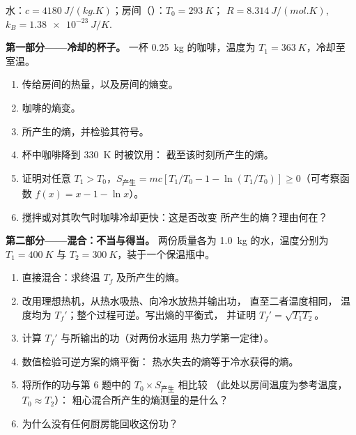\begin{problem}
\label{pb:b1:second-law-entropy:1}
水：$c = \qty{4180}{J/(kg.K)}$；房间（）：$T_0 = \qty{293}{K}$；
$R = \qty{8.314}{J/(mol.K)}$, $k_B = \qty{1.38e-23}{J/K}$.

\medskip
\noindent\textbf{第一部分——冷却的杯子。}
一杯 \qty{0.25}{kg} 的咖啡，温度为 $T_1 = \qty{363}{K}$，冷却至
室温。
\begin{enumerate}
  \item 传给房间的热量，以及房间的熵变。
  \item 咖啡的熵变。
  \item 所产生的熵，并检验其符号。
  \item 杯中咖啡降到 \qty{330}{K} 时被饮用：
        截至该时刻所产生的熵。
  \item 证明对任意 $T_1 > T_0$，$S_{\text{产生}} = mc[T_1/T_0 - 1 -
        \ln(T_1/T_0)] \geq 0$（可考察函数 $f(x) = x - 1 - \ln x$）。
  \item 搅拌或对其吹气时咖啡冷却更快：这是否改变
        所产生的熵？理由何在？
\end{enumerate}

\medskip
\noindent\textbf{第二部分——混合：不当与得当。}
两份质量各为 \qty{1.0}{kg} 的水，温度分别为 $T_1 = \qty{400}{K}$ 与 $T_2 =
\qty{300}{K}$，装于一个保温瓶中。
\begin{enumerate}[resume]
  \item 直接混合：求终温 $T_f$ 及所产生的熵。
  \item 改用理想热机，从热水吸热、向冷水放热并输出功，
        直至二者温度相同，
        温度均为 $T_f'$；整个过程可逆。写出熵的平衡式，
        并证明 $T_f' = \sqrt{T_1T_2}$。
  \item 计算 $T_f'$ 与所输出的功（对两份水运用
        热力学第一定律）。
  \item 数值检验可逆方案的熵平衡：
        热水失去的熵等于冷水获得的熵。
  \item 将所作的功与第 6 题中的 $T_0 \times S_{\text{产生}}$ 相比较
        （此处以房间温度为参考温度，$T_0 \approx T_2$）：
        粗心混合所产生的熵测量的是什么？
  \item 为什么没有任何厨房能回收这份功？
\end{enumerate}


\end{problem}
